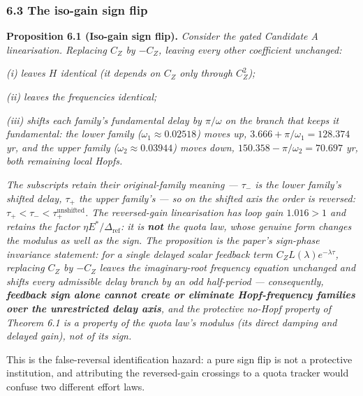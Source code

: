 \documentclass[11pt]{article}
\begin{document}
\subsubsection{6.3 The iso-gain sign flip}\label{the-iso-gain-sign-flip}

\textbf{Proposition 6.1 (Iso-gain sign flip).} \emph{Consider the gated
Candidate A linearisation. Replacing \(C_Z\) by \(-C_Z\), leaving every
other coefficient unchanged:}

\emph{(i) leaves \(H\) identical (it depends on \(C_Z\) only through
\(C_Z^2\));}

\emph{(ii) leaves the frequencies identical;}

\emph{(iii) shifts each family's fundamental delay by \(\pi/\omega\) on
the branch that keeps it fundamental: the lower family
(\(\omega_1 \approx 0.02518\)) moves up,
\(3.666 + \pi/\omega_1 = 128.374\) yr, and the upper family
(\(\omega_2 \approx 0.03944\)) moves down,
\(150.358 - \pi/\omega_2 = 70.697\) yr, both remaining local Hopfs.}

\emph{The subscripts retain their original-family meaning --- \(\tau_-\)
is the lower family's shifted delay, \(\tau_+\) the upper family's ---
so on the shifted axis the order is reversed:
\(\tau_+ < \tau_- < \tau_+^{\mathrm{unshifted}}\). The reversed-gain
linearisation has loop gain \(1.016 > 1\) and retains the factor
\(\eta E^*/\Delta_{\mathrm{ref}}\): it is \textbf{not} the quota law,
whose genuine form changes the modulus as well as the sign. The
proposition is the paper's sign-phase invariance statement: for a single
delayed scalar feedback term \(C_Z L(\lambda) e^{-\lambda\tau}\),
replacing \(C_Z\) by \(-C_Z\) leaves the imaginary-root frequency
equation unchanged and shifts every admissible delay branch by an odd
half-period --- consequently, \textbf{feedback sign alone cannot create
or eliminate Hopf-frequency families over the unrestricted delay axis},
and the protective no-Hopf property of Theorem 6.1 is a property of the
quota law's modulus (its direct damping and delayed gain), not of its
sign.}

This is the false-reversal identification hazard: a pure sign flip is
not a protective institution, and attributing the reversed-gain
crossings to a quota tracker would confuse two different effort laws.
\end{document}

